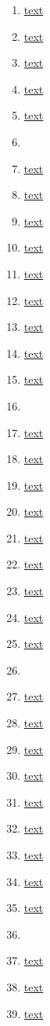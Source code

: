 \documentclass[11pt]{article}
\begin{document}
\begin{enumerate}
	\item \href{URL}{text}	%
	\item \href{URL}{text}	%
	\item \href{URL}{text}	%
	\item \href{URL}{text}	%
	\item \href{URL}{text}	%
	\item \href{URL}{}	%
	\item \href{URL}{text}	%
	\item \href{URL}{text}	%
	\item \href{URL}{text}	%
	\item \href{URL}{text}	%
	\item \href{URL}{text}	%
	\item \href{URL}{text}	%
	\item \href{URL}{text}	%
	\item \href{URL}{text}	%
	\item \href{URL}{text}	%
	\item \href{URL}{}	%
	\item \href{URL}{text}	%
	\item \href{URL}{text}	%
	\item \href{URL}{text}	%
	\item \href{URL}{text}	%
	\item \href{URL}{text}	%
	\item \href{URL}{text}	%
	\item \href{URL}{text}	%
	\item \href{URL}{text}	%
	\item \href{URL}{text}	%
	\item \href{URL}{}	%
	\item \href{URL}{text}	%
	\item \href{URL}{text}	%
	\item \href{URL}{text}	%
	\item \href{URL}{text}	%
	\item \href{URL}{text}	%
	\item \href{URL}{text}	%
	\item \href{URL}{text}	%
	\item \href{URL}{text}	%
	\item \href{URL}{text}	%
	\item \href{URL}{}	%
	\item \href{URL}{text}	%
	\item \href{URL}{text}	%
	\item \href{URL}{text}	%

\end{enumerate}
\end{document}
